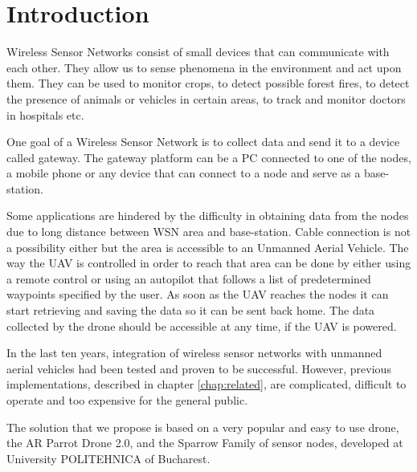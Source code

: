 \normalfont\normalsize
\chapter{Introduction}
 
Wireless Sensor Networks consist of small devices that can communicate with each other. They allow us to sense phenomena in the environment and act upon them. They can be used to monitor crops, to detect possible forest fires, to detect the presence of animals or vehicles in certain areas, to track and monitor doctors in hospitals etc. 

One goal of a Wireless Sensor Network is to collect data and send it to a device called gateway. The gateway platform can be a PC connected to one of the nodes, a mobile phone or any device that can connect to a node and serve as a base-station.


Some applications are hindered by the difficulty in obtaining data from the nodes due to long distance between WSN area and base-station. Cable connection is not a possibility either but the area is accessible to an Unmanned Aerial Vehicle. The way the UAV is controlled in order to reach that area can be done by either using a remote control or using an autopilot that follows a list of predetermined waypoints specified by the user. As soon as the UAV reaches the nodes it can start retrieving and saving the data so it can be sent back home. The data collected by the drone should be accessible at any time, if the UAV is powered.
 
In the last ten years, integration of wireless sensor networks with unmanned aerial vehicles had been tested and proven to be successful. However, previous implementations, described in chapter \ref{chap:related}, are complicated, difficult to operate and too expensive for the general public.

The solution that we propose is based on a very popular and easy to use drone, the AR Parrot Drone 2.0, and the Sparrow Family \cite{voinescu2013lightweight} of sensor nodes, developed at University POLITEHNICA of Bucharest.
